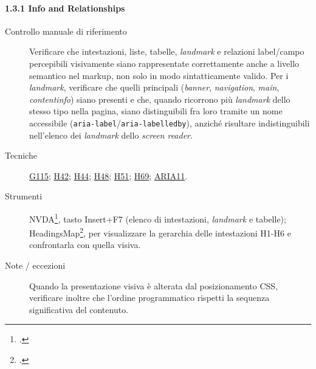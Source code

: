 \paragraph*{1.3.1 Info and Relationships}
\begin{description}
\item[Controllo manuale di riferimento] Verificare che intestazioni, liste, tabelle, \emph{landmark} e relazioni label/campo percepibili visivamente siano rappresentate correttamente anche a livello semantico nel markup, non solo in modo sintatticamente valido. Per i \emph{landmark}, verificare che quelli principali (\emph{banner}, \emph{navigation}, \emph{main}, \emph{contentinfo}) siano presenti e che, quando ricorrono più \emph{landmark} dello stesso tipo nella pagina, siano distinguibili fra loro tramite un nome accessibile (\texttt{aria-label}/\texttt{aria-labelledby}), anziché risultare indistinguibili nell'elenco dei \emph{landmark} dello \emph{screen reader}.
\item[Tecniche] \href{https://www.w3.org/WAI/WCAG21/Techniques/general/G115.html}{G115}; \href{https://www.w3.org/WAI/WCAG21/Techniques/html/H42.html}{H42}; \href{https://www.w3.org/WAI/WCAG21/Techniques/html/H44.html}{H44}; \href{https://www.w3.org/WAI/WCAG21/Techniques/html/H48.html}{H48}; \href{https://www.w3.org/WAI/WCAG21/Techniques/html/H51.html}{H51}; \href{https://www.w3.org/WAI/WCAG21/Techniques/html/H69.html}{H69}; \href{https://www.w3.org/WAI/WCAG21/Techniques/aria/ARIA11.html}{ARIA11}.
\item[Strumenti] NVDA\footcite{nvda:screenreader}, tasto Insert+F7 (elenco di intestazioni, \emph{landmark} e tabelle); HeadingsMap\footcite{headingsmap:extension}, per visualizzare la gerarchia delle intestazioni H1-H6 e confrontarla con quella visiva.
\item[Note / eccezioni] Quando la presentazione visiva è alterata dal posizionamento CSS, verificare inoltre che l'ordine programmatico rispetti la sequenza significativa del contenuto.
\end{description}

